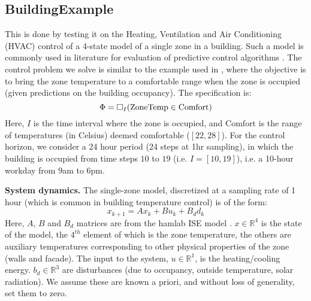 \subsection{BuildingExample}

This is done by testing it on the Heating, Ventilation and Air Conditioning (HVAC) control of a 4-state model of a single zone in a building. Such a model is commonly used in literature for evaluation of predictive control algorithms \cite{Jain2016}. The control problem we solve is similar to the example used in \cite{Raman14_MPCSTL}, where the objective is to bring the zone temperature to a comfortable range when the zone is occupied (given predictions on the building occupancy). The specification is:
\begin{equation}
\label{eq:BldgSpec}
\Phi= \square_I(\text{ZoneTemp} \in \text{Comfort})
\end{equation}
Here, $I$ is the time interval where the zone is occupied, and $\text{Comfort}$ is the range of temperatures (in Celsius) deemed comfortable ($[22,28]$). For the control horizon, we consider a 24 hour period (24 steps at 1hr sampling), in which the building is occupied from time steps $10$ to $19$ (i.e. $I=[10,19]$), i.e. a 10-hour workday from 9am to 6pm. 

\textbf{System dynamics.} The single-zone model, discretized at a sampling rate of 1 hour (which is common in building temperature control) is of the form:
\begin{equation}
\label{eq:bldg_dyn}
x_{k+1} = Ax_{k}+Bu_k+B_dd_k
\end{equation}
Here, $A$, $B$ and $B_d$ matrices are from the hamlab ISE model \cite{VanSchijndel2005}. $x \in \mathbb{R}^4$ is the state of the model, the $4^{th}$ element of which is the zone temperature, the others are auxiliary temperatures corresponding to other physical properties of the zone (walls and facade). The input to the system, $u \in \mathbb{R}^1$, is the heating/cooling energy. $b_d \in \mathbb{R}^3$ are disturbances (due to occupancy, outside temperature, solar radiation). We assume these are known a priori, and without loss of generality, set them to zero.


